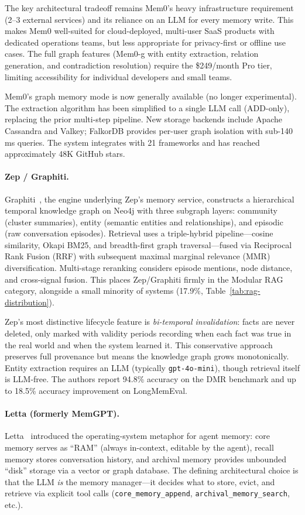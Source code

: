 The key architectural tradeoff remains Mem0's heavy infrastructure
requirement (2--3 external services) and its reliance on an LLM for
every memory write.  This makes Mem0 well-suited for cloud-deployed,
multi-user SaaS products with dedicated operations teams, but less
appropriate for privacy-first or offline use cases.  The full graph
features (Mem0-g with entity extraction, relation generation, and
contradiction resolution) require the \$249/month Pro tier, limiting
accessibility for individual developers and small teams.

Mem0's graph memory mode is now generally available (no longer
experimental). The extraction algorithm has been simplified to a single
LLM call (ADD-only), replacing the prior multi-step pipeline.
New storage backends include Apache Cassandra and Valkey; FalkorDB
provides per-user graph isolation with sub-140\,ms queries.
The system integrates with 21 frameworks and has reached approximately
48K GitHub stars.

\paragraph{Zep / Graphiti.}
Graphiti~\cite{dempsey2025graphiti}, the engine underlying Zep's memory
service, constructs a hierarchical temporal knowledge graph on Neo4j
with three subgraph layers: community (cluster summaries), entity
(semantic entities and relationships), and episodic (raw conversation
episodes). Retrieval uses a triple-hybrid pipeline---cosine similarity,
Okapi BM25, and breadth-first graph traversal---fused via Reciprocal
Rank Fusion (RRF) with subsequent maximal marginal relevance (MMR)
diversification. Multi-stage reranking considers episode mentions, node
distance, and cross-signal fusion. This places Zep/Graphiti firmly in
the Modular RAG category, alongside a small minority of systems
(17.9\%, Table~\ref{tab:rag-distribution}).

Zep's most distinctive lifecycle feature is \emph{bi-temporal
invalidation}: facts are never deleted, only marked with validity
periods recording when each fact was true in the real world and when
the system learned it. This conservative approach preserves full
provenance but means the knowledge graph grows monotonically. Entity
extraction requires an LLM (typically \texttt{gpt-4o-mini}), though
retrieval itself is LLM-free. The authors report 94.8\% accuracy on
the DMR benchmark and up to 18.5\% accuracy improvement on
LongMemEval.

\paragraph{Letta (formerly MemGPT).}
Letta~\cite{packer2023memgpt} introduced the operating-system metaphor
for agent memory: core memory serves as ``RAM'' (always in-context,
editable by the agent), recall memory stores conversation history, and
archival memory provides unbounded ``disk'' storage via a vector or
graph database. The defining architectural choice is that the LLM
\emph{is} the memory manager---it decides what to store, evict, and
retrieve via explicit tool calls (\texttt{core\_memory\_append},
\texttt{archival\_memory\_search}, etc.).

